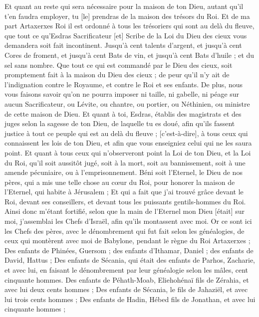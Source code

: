 \begin{multicols}{2}
Et quant au reste qui sera nécessaire pour la maison de ton Dieu, autant qu'il t'en faudra employer, tu [le] prendras de la maison des trésors du Roi.
Et de ma part Artaxerxes Roi il est ordonné à tous les trésoriers qui sont au delà du fleuve, que tout ce qu'Esdras Sacrificateur [et] Scribe de la Loi du Dieu des cieux vous demandera soit fait incontinent.
Jusqu'à cent talents d'argent, et jusqu'à cent Cores de froment, et jusqu'à cent Bats de vin, et jusqu'à cent Bats d'huile ; et du sel sans nombre.
Que tout ce qui est commandé par le Dieu des cieux, soit promptement fait à la maison du Dieu des cieux ; de peur qu'il n'y ait de l'indignation contre le Royaume, et contre le Roi et ses enfants.
De plus, nous vous faisons savoir qu'on ne pourra imposer ni taille, ni gabelle, ni péage sur aucun Sacrificateur, ou Lévite, ou chantre, ou portier, ou Néthinien, ou ministre de cette maison de Dieu.
Et quant à toi, Esdras, établis des magistrats et des juges selon la sagesse de ton Dieu, de laquelle tu es doué, afin qu'ils fassent justice à tout ce peuple qui est au delà du fleuve ; [c'est-à-dire], à tous ceux qui connaissent les lois de ton Dieu, et afin que vous enseigniez celui qui ne les saura point.
Et quant à tous ceux qui n'observeront point la Loi de ton Dieu, et la Loi du Roi, qu'il soit aussitôt jugé, soit à la mort, soit au bannissement, soit à une amende pécuniaire, ou à l'emprisonnement.
Béni soit l'Eternel, le Dieu de nos pères, qui a mis une telle chose au cœur du Roi, pour honorer la maison de l'Eternel, qui habite à Jérusalem ;
Et qui a fait que j'ai trouvé grâce devant le Roi, devant ses conseillers, et devant tous les puissants gentils-hommes du Roi. Ainsi donc m'étant fortifié, selon que la main de l'Eternel mon Dieu [était] sur moi, j'assemblai les Chefs d'Israël, afin qu'ils montassent avec moi.
\VerseOne{}Or ce sont ici les Chefs des pères, avec le dénombrement qui fut fait selon les généalogies, de ceux qui montèrent avec moi de Babylone, pendant le règne du Roi Artaxerxes ;
Des enfants de Phinées, Guersom ; des enfants d'Ithamar, Daniel ; des enfants de David, Hattus ;
Des enfants de Sécania, qui était des enfants de Parhos, Zacharie, et avec lui, en faisant le dénombrement par leur généalogie selon les mâles, cent cinquante hommes.
Des enfants de Péhath-Moab, Eliehohénaï fils de Zérahia, et avec lui deux cents hommes ;
Des enfants de Sécania, le fils de Jahaziël, et avec lui trois cents hommes ;
Des enfants de Hadin, Hébed fils de Jonathan, et avec lui cinquante hommes ;

\end{multicols}
